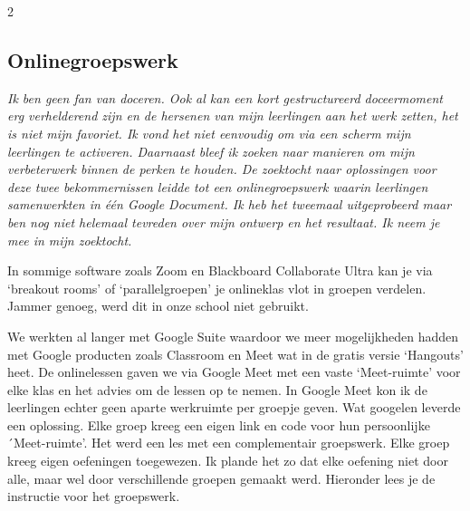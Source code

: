 \begin {multicols}{2}
\subsection{Onlinegroepswerk}
\emph{Ik ben geen fan van doceren. Ook al kan een kort gestructureerd doceermoment erg verhelderend zijn en de hersenen van mijn leerlingen aan het werk zetten, het is niet mijn favoriet. Ik vond het niet eenvoudig om via een scherm mijn leerlingen te activeren. Daarnaast bleef ik zoeken naar manieren om mijn verbeterwerk binnen de perken te houden. De zoektocht naar oplossingen voor deze twee bekommernissen leidde tot een onlinegroepswerk waarin leerlingen samenwerkten in één Google Document. Ik heb het tweemaal uitgeprobeerd maar ben nog niet helemaal tevreden over mijn ontwerp en het resultaat. Ik neem je mee in mijn zoektocht.}

In sommige software zoals Zoom en Blackboard Collaborate Ultra kan je via `breakout rooms' of `parallelgroepen' je onlineklas vlot in groepen verdelen. Jammer genoeg, werd dit in onze school niet gebruikt. 

We werkten al langer met Google Suite waardoor we meer mogelijkheden hadden met Google producten zoals Classroom en Meet wat in de gratis versie `Hangouts' heet. De onlinelessen gaven we via Google Meet met een vaste `Meet-ruimte' voor elke klas en het advies om de lessen op te nemen. In Google Meet kon ik de leerlingen echter geen aparte werkruimte per groepje geven. Wat googelen leverde een oplossing. Elke groep kreeg een eigen link en code voor hun persoonlijke ´Meet-ruimte'. Het werd een les met een complementair groepswerk. Elke groep kreeg eigen oefeningen toegewezen. Ik plande het zo dat elke oefening niet door alle, maar wel door verschillende groepen gemaakt werd. Hieronder lees je de instructie voor het groepswerk.
\end{multicols}
\newpage


